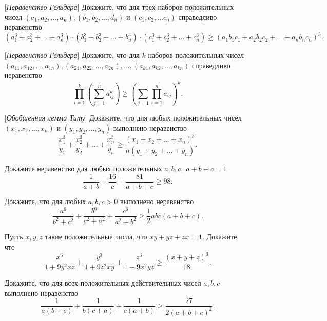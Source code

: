 \documentclass[a4paper,12pt,leqno]{article}
\begin{document}
	\begin{enumerate}
		
		\item[\z] [\textit{Неравенство Гёльдера}] Докажите, что для трех наборов положительных чисел $(a_1, a_2, \dots , a_n),  (b_1, b_2, \dots , d_n)$ и $(c_1, c_2, \dots c_n)$ справедливо неравенство
		$$(a_1^3 + a_2^3 + \dots + a_n^3) \cdot (b_1^3 + b_2^3 + \dots + b_n^3) \cdot (c_1^3 + c_2^3 + \dots + c_n^3) \geqslant (a_1b_1c_1 + a_2b_2c_2 + \dots + a_nb_nc_n)^3.$$
		
		\item[\z] [\textit{Неравенство Гёльдера}] Докажите, что для $k$ наборов положительных чисел $(a_{11}, a_{12}, \dots , a_{1n}), (a_{21}, a_{22}, \dots , a_{2n}), \dots , (a_{k1}, a_{k2}, \dots , a_{kn})$ справедливо неравенство
		$$\prod\limits_{i = 1}^{k} \left(\sum\limits_{j = 1}^n a_{ij}^k \right) \geqslant \left( \sum\limits_{j = 1} \prod\limits_{i = 1}^n a_{ij} \right)^k .$$
		
		\item[\z] [\textit{Обобщенная лемма Титу}] Докажите, что для любых положительных чисел $(x_1, x_2, \dots , x_n)$ и $(y_1, y_2, \dots, y_n)$ выполнено неравенство $$\frac{x_1^3}{y_1} +\frac{x_2^3}{y_2} + \dots + \frac{x_n^3}{y_n} \geqslant \frac{(x_1 + x_2 + \dots + x_n)^3}{n(y_1 + y_2 + \dots + y_n)}.$$
		
		\item[\z] Докажите неравенство для любых положительных $a, b, c, \; a+b+c = 1$ $$\frac{1}{a+b} + \frac{16}{c} + \frac{81}{a+b+c} \geqslant 98.$$
		\item[\z] Докажите, что для любых $a, b, c > 0$ выполнено неравенство $$\frac{a^6}{b^2+c^2} + \frac{b^6}{c^2+a^2} + \frac{c^6}{a^2+b^2} \geqslant \frac{1}{2}abc(a+b+c).$$
		\item[\z] Пусть $x, y, z$ такие положительные числа, что $xy + yz +zx = 1$. Докажите, что $$\frac{x^3}{1+9y^2xz} + \frac{y^3}{1+9z^2xy} + \frac{z^3}{1+9x^2yz} \geqslant \frac{(x+y+z)^3}{18}.$$
		
		
		\item[\z] Докажите, что для всех положительных действительных чисел $a, b, c$ выполнено неравенство $$\frac{1}{a(b+c)} + \frac{1}{b(c+a)} + \frac{1}{c(a+b)} \geqslant \frac{27}{2(a+b+c)^2}.$$
		
		
	\end{enumerate}
	
	
	
	
	
	
	
	
	
	
	
	
	
	
	
	
	
	
	
	
	
	
	
	
	
	
	
	
\end{document}
